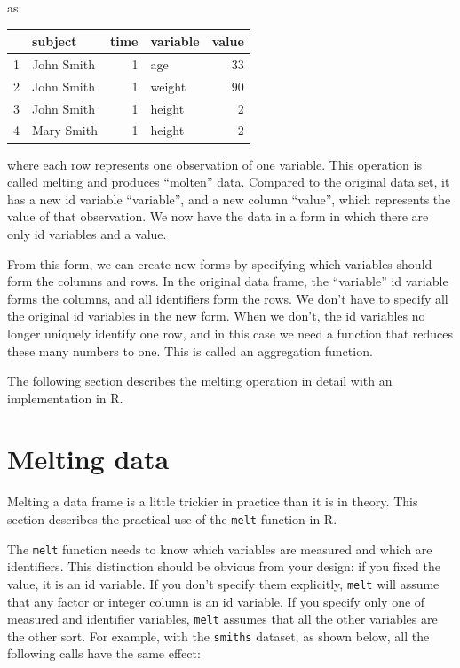 \documentclass[oneside,letterpaper]{scrartcl}
\begin{document}
\bigskip
\noindent as:
\bigskip

\begin{tabular}{|l|l|r||l|r|}
\hline
 & subject & time & variable & value \\
\hline
1 & John Smith & 1 & age & 33 \\
2 & John Smith & 1 & weight & 90 \\
3 & John Smith & 1 & height & 2 \\
4 & Mary Smith & 1 & height & 2 \\
\hline
\end{tabular}

\bigskip
\noindent where each row represents one observation of one variable.  This operation is called melting and produces ``molten'' data.  Compared to the original data set, it has a new id variable ``variable'', and a new column ``value'', which represents the value of that observation.  We now have the data in a form in which there are only id variables and a value.

From this form, we can create new forms by specifying which variables should form the columns and rows.  In the original data frame, the ``variable'' id variable forms the columns, and all identifiers form the rows.  We don't have to specify all the original id variables in the new form.  When we don't, the id variables no longer uniquely identify one row, and in this case we need a function that reduces these many numbers to one.  This is called an aggregation function. 

The following section describes the melting operation in detail with an implementation in R.

\newpage
\section{Melting data}

Melting a data frame is a little trickier in practice than it is in theory.  This section describes the practical use of the {\tt melt} function in R.

The {\tt melt} function needs to know which variables are measured and which are identifiers.  This distinction should be obvious from your design: if you fixed the value, it is an id variable.  If you don't specify them explicitly, {\tt melt} will assume that any factor or integer column is an id variable.  If you specify only one of measured and identifier variables, {\tt melt} assumes that all the other variables are the other sort.  For example, with the {\tt smiths} dataset, as shown below, all the following calls have the same effect:
\end{document}
